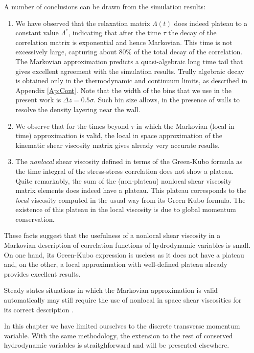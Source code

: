 \documentclass[b5paper,openright,11pt]{book}
\begin{document}
A number of conclusions can be drawn from the simulation results:
\begin{enumerate}
\item We  have observed that  the relaxation matrix  $\Lambda(t)$ does
  indeed  plateau to  a  constant value  $\Lambda^*$, indicating  that
  after  the  time $\tau$  the  decay  of  the correlation  matrix  is
  exponential  and  hence Markovian. This  time  is not  excessively
    large, capturing about  80\% of the total decay  of the correlation.
  The  Markovian approximation  predicts a  quasi-algebraic long  time
  tail  that gives  excellent agreement  with the  simulation results.
  Trully algebraic  decay is  obtained only  in the  thermodynamic and
  continuum limits, as described  in Appendix \ref{Ap:Cont}. Note that
  the width  of the bins  that we use in  the present work  is $\Delta
  z=0.5\sigma$.  Such bin  size allows,  in the  presence of  walls to
  resolve the density layering near the wall.
\item  We observe  that  for  the times  beyond  $\tau$  in which  the
  Markovian (local in time) approximation is valid, the local in space
  approximation of the kinematic  shear viscosity matrix gives already
  very accurate results.
\item The \textit{nonlocal}  shear viscosity defined in  terms of the
  Green-Kubo  formula  as  the  time  integral  of  the  stress-stress
  correlation does  not show a  plateau. Quite remarkably, the  sum of
  the  (non-plateau) nonlocal  shear viscosity  matrix elements  does
  indeed   have  a   plateau.    This  plateau   corresponds  to   the
  \textit{local}  viscosity  computed  in   the  usual  way  from  its
  Green-Kubo  formula. The  existence  of this  plateau  in the  local
  viscosity is due to global momentum conservation.
\end{enumerate}
These facts suggest that the usefulness of a nonlocal shear viscosity
in a  Markovian description  of correlation functions  of hydrodynamic
variables is small.  On one hand, its Green-Kubo expression is useless
as it does not have a plateau and, on the other, a local approximation
with well-defined plateau already provides excellent results.

Steady states situations in which the Markovian approximation is valid
automatically may  still require the  use of nonlocal in  space shear
viscosities for its correct description \cite{.}.

In  this chapter  we  have  limited  ourselves to  the  discrete
transverse  momentum   variable.   With  the  same   methodology,  the
extension  to   the  rest  of  conserved   hydrodynamic  variables  is
straitghforward and will be presented elsewhere. 
\end{document}
